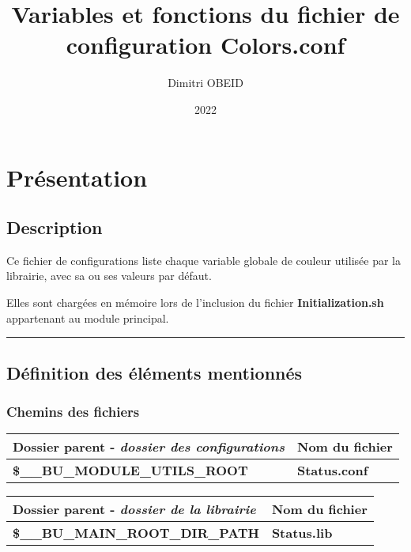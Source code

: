 \documentclass[a4paper,10pt]{article}
\title{\color{sec1}Variables et fonctions du fichier de configuration \color{path}Colors.conf}\color{text}
\author{Dimitri OBEID}
\date{2022}
\begin{document}
\maketitle
\newpage

\hypertarget{contents}{}
\tableofcontents
\newpage

\color{sec1}
\section{Présentation}\color{text}

\color{sec2}
\subsection{Description}\color{text}

\begin{justify}
    Ce fichier de configurations liste chaque variable globale de couleur utilisée par la librairie, avec sa ou ses valeurs par défaut.
\end{justify}

\begin{justify}
    Elles sont chargées en mémoire lors de l'inclusion du fichier \textbf{\color{path}Initialization.sh} appartenant au module principal.
\end{justify}



\color{sec2}\par\noindent\rule{\textwidth}{0.4pt}\color{text}

\color{sec2}
\subsection{Définition des éléments mentionnés}\color{text}

\color{sec3}
\subsubsection{Chemins des fichiers}\color{text}

\begin{justify}
    \begin{tabular}{|l|l|}
        \hline
        \textbf{Dossier parent} - \textit{dossier des configurations}    & \textbf{Nom du fichier}\\
        \hline
        \textbf{\color{vars}\$\_\_BU\_MODULE\_UTILS\_ROOT}      & \textbf{\color{path}Status.conf}\\
        \hline
    \end{tabular}


    \begin{tabular}{|l|l|}
        \hline
        \textbf{Dossier parent} - \textit{dossier de la librairie}       & \textbf{Nom du fichier}\\
        \hline
        \textbf{\color{vars}\$\_\_BU\_MAIN\_ROOT\_DIR\_PATH}    & \textbf{\color{path}Status.lib}\\
        \hline
    \end{tabular}
\end{justify}
\end{document}
